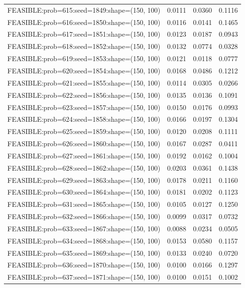 \begin{longtable}{lccc}
FEASIBLE:prob=615:seed=1849:shape=(150, 100) & 0.0111 & 0.0360 & 0.1116 \\
FEASIBLE:prob=616:seed=1850:shape=(150, 100) & 0.0116 & 0.0141 & 0.1465 \\
FEASIBLE:prob=617:seed=1851:shape=(150, 100) & 0.0123 & 0.0187 & 0.0943 \\
FEASIBLE:prob=618:seed=1852:shape=(150, 100) & 0.0132 & 0.0774 & 0.0328 \\
FEASIBLE:prob=619:seed=1853:shape=(150, 100) & 0.0121 & 0.0118 & 0.0777 \\
FEASIBLE:prob=620:seed=1854:shape=(150, 100) & 0.0168 & 0.0486 & 0.1212 \\
FEASIBLE:prob=621:seed=1855:shape=(150, 100) & 0.0114 & 0.0305 & 0.0266 \\
FEASIBLE:prob=622:seed=1856:shape=(150, 100) & 0.0135 & 0.0136 & 0.1091 \\
FEASIBLE:prob=623:seed=1857:shape=(150, 100) & 0.0150 & 0.0176 & 0.0993 \\
FEASIBLE:prob=624:seed=1858:shape=(150, 100) & 0.0166 & 0.0197 & 0.1304 \\
FEASIBLE:prob=625:seed=1859:shape=(150, 100) & 0.0120 & 0.0208 & 0.1111 \\
FEASIBLE:prob=626:seed=1860:shape=(150, 100) & 0.0167 & 0.0287 & 0.0411 \\
FEASIBLE:prob=627:seed=1861:shape=(150, 100) & 0.0192 & 0.0162 & 0.1004 \\
FEASIBLE:prob=628:seed=1862:shape=(150, 100) & 0.0203 & 0.0361 & 0.1438 \\
FEASIBLE:prob=629:seed=1863:shape=(150, 100) & 0.0178 & 0.0211 & 0.1160 \\
FEASIBLE:prob=630:seed=1864:shape=(150, 100) & 0.0181 & 0.0202 & 0.1123 \\
FEASIBLE:prob=631:seed=1865:shape=(150, 100) & 0.0105 & 0.0127 & 0.1250 \\
FEASIBLE:prob=632:seed=1866:shape=(150, 100) & 0.0099 & 0.0317 & 0.0732 \\
FEASIBLE:prob=633:seed=1867:shape=(150, 100) & 0.0088 & 0.0234 & 0.0505 \\
FEASIBLE:prob=634:seed=1868:shape=(150, 100) & 0.0153 & 0.0580 & 0.1157 \\
FEASIBLE:prob=635:seed=1869:shape=(150, 100) & 0.0133 & 0.0240 & 0.0720 \\
FEASIBLE:prob=636:seed=1870:shape=(150, 100) & 0.0100 & 0.0166 & 0.1297 \\
FEASIBLE:prob=637:seed=1871:shape=(150, 100) & 0.0100 & 0.0151 & 0.1002 \\

\end{longtable}
